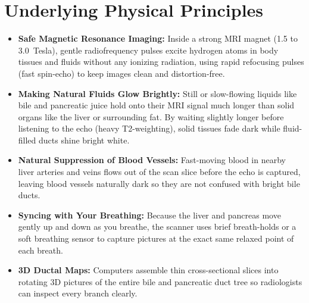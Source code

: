 \section{Underlying Physical Principles}
\begin{itemize}
\item \textbf{Safe Magnetic Resonance Imaging:} Inside a strong MRI magnet (1.5 to 3.0~Tesla), gentle radiofrequency pulses excite hydrogen atoms in body tissues and fluids without any ionizing radiation, using rapid refocusing pulses (fast spin-echo) to keep images clean and distortion-free.
\item \textbf{Making Natural Fluids Glow Brightly:} Still or slow-flowing liquids like bile and pancreatic juice hold onto their MRI signal much longer than solid organs like the liver or surrounding fat. By waiting slightly longer before listening to the echo (heavy T2-weighting), solid tissues fade dark while fluid-filled ducts shine bright white.
\item \textbf{Natural Suppression of Blood Vessels:} Fast-moving blood in nearby liver arteries and veins flows out of the scan slice before the echo is captured, leaving blood vessels naturally dark so they are not confused with bright bile ducts.
\item \textbf{Syncing with Your Breathing:} Because the liver and pancreas move gently up and down as you breathe, the scanner uses brief breath-holds or a soft breathing sensor to capture pictures at the exact same relaxed point of each breath.
\item \textbf{3D Ductal Maps:} Computers assemble thin cross-sectional slices into rotating 3D pictures of the entire bile and pancreatic duct tree so radiologists can inspect every branch clearly.
\end{itemize}


